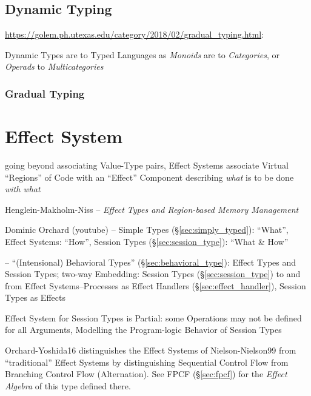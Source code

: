 \subsection{Dynamic Typing}\label{sec:dynamic_typing}

\url{https://golem.ph.utexas.edu/category/2018/02/gradual_typing.html}:

Dynamic Types are to Typed Languages as \emph{Monoids} are to
\emph{Categories}, or \emph{Operads} to \emph{Multicategories}



\subsubsection{Gradual Typing}\label{sec:gradual_typing}



\section{Effect System}\label{sec:effect_system}

going beyond associating Value-Type pairs, Effect Systems associate
Virtual ``Regions'' of Code with an ``Effect'' Component describing
\emph{what} is to be done \emph{with what}

Henglein-Makholm-Niss -- \emph{Effect Types and Region-based Memory
Management}

Dominic Orchard (youtube) -- Simple Types (\S\ref{sec:simply_typed}):
``What'', Effect Systems: ``How'', Session Types
(\S\ref{sec:session_type}): ``What \& How''

\cite{orchard-yoshida16} -- ``(Intensional) Behavioral Types''
(\S\ref{sec:behavioral_type}): Effect Types and Session Types; two-way
Embedding: Session Types (\S\ref{sec:session_type}) to and from Effect
Systems--Processes as Effect Handlers (\S\ref{sec:effect_handler}),
Session Types as Effects

Effect System for Session Types is Partial: some Operations may not be
defined for all Arguments, Modelling the Program-logic Behavior of
Session Types \cite{orchard-yoshida16} %

\fist Orchard-Yoshida16 \cite{orchard-yoshida16} distinguishes the
Effect Systems of Nielson-Nielson99 \cite{nielson-nielson99} from
``traditional'' Effect Systems by distinguishing Sequential Control
Flow from Branching Control Flow (Alternation). See FPCF
(\S\ref{sec:fpcf}) for the \emph{Effect Algebra} of this type defined
there.

